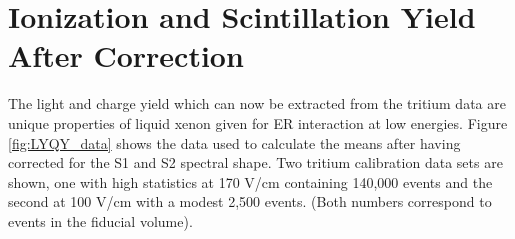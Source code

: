  %

\newpage

\section{Ionization and Scintillation Yield After Correction}

The light and charge yield which can now be extracted from the tritium data are unique properties of liquid xenon given for ER interaction at low energies. Figure \ref{fig:LYQY_data} shows the data used to calculate the means after having corrected for the S1 and S2 spectral shape. Two tritium calibration data sets are shown, one with high statistics at 170 V/cm containing 140,000 events and the second at 100 V/cm with a modest 2,500 events. (Both numbers correspond to events in the fiducial volume).
 
 

